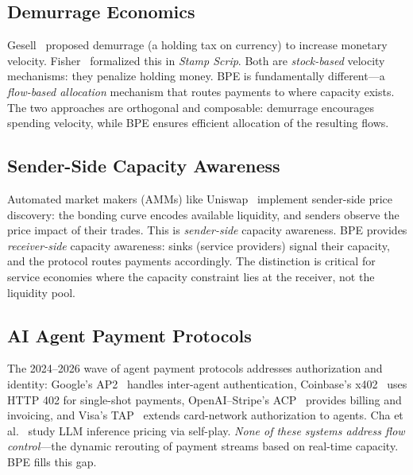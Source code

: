 \subsection{Demurrage Economics}

Gesell~\cite{gesell1916natural} proposed demurrage (a holding tax on currency) to
increase monetary velocity. Fisher~\cite{fisher1933stamp} formalized this in \emph{Stamp
Scrip}. Both are \emph{stock-based} velocity mechanisms: they penalize holding money.
BPE is fundamentally different---a \emph{flow-based allocation} mechanism that routes
payments to where capacity exists. The two approaches are orthogonal and composable:
demurrage encourages spending velocity, while BPE ensures efficient allocation of
the resulting flows.

\subsection{Sender-Side Capacity Awareness}

Automated market makers (AMMs) like Uniswap~\cite{adams2021uniswap} implement
sender-side price discovery: the bonding curve encodes available liquidity, and
senders observe the price impact of their trades. This is \emph{sender-side}
capacity awareness. BPE provides \emph{receiver-side} capacity awareness:
sinks (service providers) signal their capacity, and the protocol routes payments
accordingly. The distinction is critical for service economies where the capacity
constraint lies at the receiver, not the liquidity pool.

\subsection{AI Agent Payment Protocols}

The 2024--2026 wave of agent payment protocols addresses authorization and identity:
Google's AP2~\cite{google2025ap2} handles inter-agent authentication,
Coinbase's x402~\cite{coinbase2025x402} uses HTTP 402 for single-shot payments,
OpenAI--Stripe's ACP~\cite{openai2025acp} provides billing and invoicing, and
Visa's TAP~\cite{visa2025tap} extends card-network authorization to agents.
Cha et al.~\cite{cha2025stp} study LLM inference pricing via self-play.
\emph{None of these systems address flow control}---the dynamic rerouting of
payment streams based on real-time capacity. BPE fills this gap.
